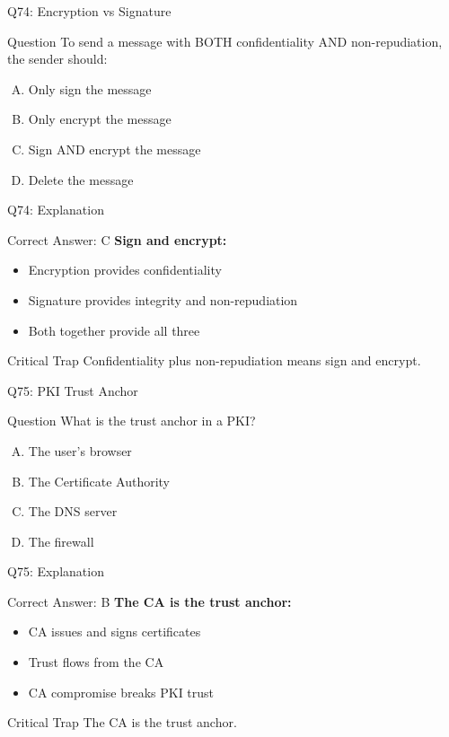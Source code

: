 \documentclass{beamer}
\begin{document}
	\begin{frame}{Q74: Encryption vs Signature}
		\begin{block}{Question}
			To send a message with BOTH confidentiality AND non-repudiation, the sender should:
		\end{block}
		\begin{enumerate}[(A)]
			\item Only sign the message
			\item Only encrypt the message
			\item Sign AND encrypt the message
			\item Delete the message
		\end{enumerate}
	\end{frame}
	
	\begin{frame}{Q74: Explanation}
		\begin{block}{Correct Answer: C}
			\textbf{Sign and encrypt:}
			\begin{itemize}
				\item Encryption provides confidentiality
				\item Signature provides integrity and non-repudiation
				\item Both together provide all three
			\end{itemize}
		\end{block}
		\begin{alertblock}{Critical Trap}
			Confidentiality plus non-repudiation means sign and encrypt.
		\end{alertblock}
	\end{frame}
	
	\begin{frame}{Q75: PKI Trust Anchor}
		\begin{block}{Question}
			What is the trust anchor in a PKI?
		\end{block}
		\begin{enumerate}[(A)]
			\item The user's browser
			\item The Certificate Authority
			\item The DNS server
			\item The firewall
		\end{enumerate}
	\end{frame}
	
	\begin{frame}{Q75: Explanation}
		\begin{block}{Correct Answer: B}
			\textbf{The CA is the trust anchor:}
			\begin{itemize}
				\item CA issues and signs certificates
				\item Trust flows from the CA
				\item CA compromise breaks PKI trust
			\end{itemize}
		\end{block}
		\begin{alertblock}{Critical Trap}
			The CA is the trust anchor.
		\end{alertblock}
	\end{frame}
	
\end{document}
